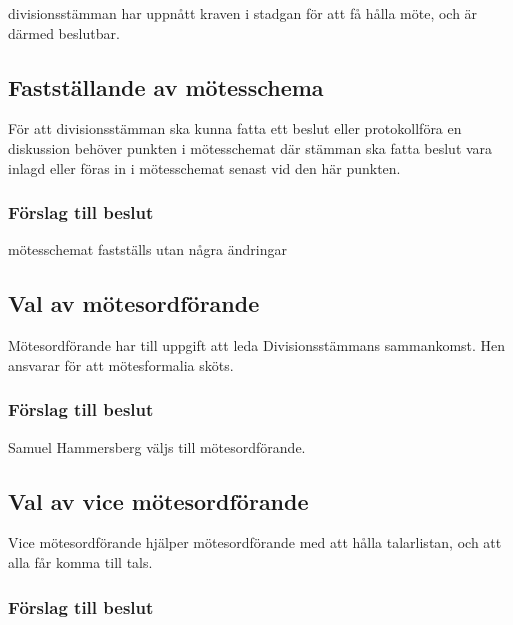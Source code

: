 \documentclass[protokoll]{dvd}
\begin{document}
\begin{attsatser}
    \item divisionsstämman har uppnått kraven i stadgan för att få hålla möte, och är därmed beslutbar.
\end{attsatser}

\subsection{Fastställande av mötesschema}

För att divisionsstämman ska kunna fatta ett beslut eller protokollföra en diskussion behöver punkten i mötesschemat där stämman ska fatta beslut vara inlagd eller föras in i mötesschemat senast vid den här punkten.

\subsubsection*{Förslag till beslut}

\begin{attsatser}
    \item mötesschemat fastställs utan några ändringar
\end{attsatser}


\subsection{Val av mötesordförande}

Mötesordförande har till uppgift att leda Divisionsstämmans sammankomst.
Hen ansvarar för att mötesformalia sköts.

\subsubsection*{Förslag till beslut}

\begin{attsatser}
    \item Samuel Hammersberg väljs till mötesordförande.
\end{attsatser}


\subsection{Val av vice mötesordförande}

Vice mötesordförande hjälper mötesordförande med att hålla talarlistan, och att alla får komma till tals.

\subsubsection*{Förslag till beslut}
\end{document}
